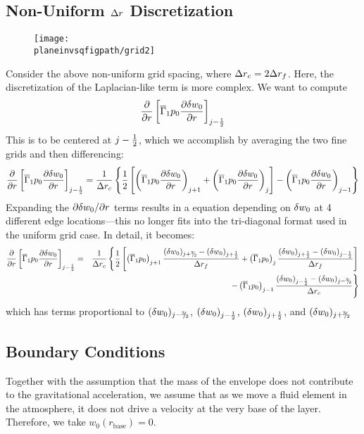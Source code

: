 \subsection{Non-Uniform $\Delta r$ Discretization}

\begin{figure}[h]
\centering
\texttt{[image: \\planeinvsqfigpath/grid2]}
\end{figure}

Consider the above non-uniform grid spacing,
where $\Delta r_c = 2 \Delta r_f$.  Here, the discretization of the Laplacian-like term is more complex.
We want to compute
\begin{equation}
\frac{\partial}{\partial r} \left [ \overline{\Gamma}_1 p_0 \frac{\partial \delta w_0}{\partial r} \right ]_{j-\frac{1}{2}}
\end{equation}
This is to be centered at $j-\frac{1}{2}$, which we accomplish by averaging the two fine grids and then
differencing:
\begin{equation}
\frac{\partial}{\partial r} \left [ \overline{\Gamma}_1 p_0 \frac{\partial \delta w_0}{\partial r} \right ]_{j-\frac{1}{2}} =
\frac{1}{\Delta r_c} \left \{ \frac{1}{2} \left [
      \left ( \overline{\Gamma}_1 p_0 \frac{\partial \delta w_0}{\partial r} \right )_{j+1} +
      \left ( \overline{\Gamma}_1 p_0 \frac{\partial \delta w_0}{\partial r} \right )_{j} \right ]
   - \left ( \overline{\Gamma}_1 p_0 \frac{\partial \delta w_0}{\partial r} \right )_{j-1} 
\right \}
\end{equation}
Expanding the $\partial \delta w_0 / \partial r$ terms results in a equation depending on $\delta w_0$ at
4 different edge locations---this no longer fits into the tri-diagonal format used in the
uniform grid case.  In detail, it becomes:
\begin{eqnarray}
\frac{\partial}{\partial r} \left [ \gammabar p_0 \frac{\partial \dw}{\partial r} \right ]_{j-\half} &=& 
\frac{1}{\dr_c} \left \{  \frac{1}{2} \left [
      \left ( \gammabar p_0 \right )_{j+1} \frac{(\dw)_{j+\thalf} - (\dw)_{j+\half}}{\dr_f} +
      \left ( \gammabar p_0 \right )_{j}   \frac{(\dw)_{j+\half} - (\dw)_{j-\half}}{\dr_f}  \right ] \right .  \nonumber \\
&& \qquad \left .  - \left ( \gammabar p_0 \right )_{j-1} \frac{(\dw)_{j-\half} - (\dw)_{j-\thalf}}{\dr_c}  
\right \}
\end{eqnarray}
which has terms proportional to $(\dw)_{j-\thalf}$, $(\delta w_0)_{j-\frac{1}{2}}$, $(\delta w_0)_{j+\frac{1}{2}}$, and $(\dw)_{j+\thalf}$


\subsection{Boundary Conditions}

Together with the assumption that the mass of the envelope does not
contribute to the gravitational acceleration, we assume that as we move
a fluid element in the atmosphere, it does not drive a velocity at the very 
base of the layer.  Therefore, we take $w_0(r_\mathrm{base}) = 0$.



